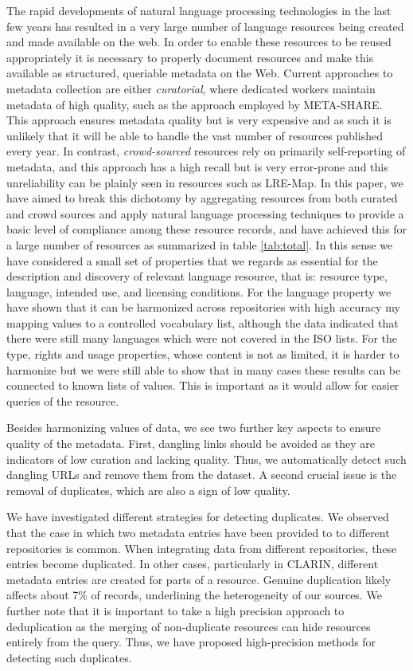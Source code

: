 \documentclass[11pt]{article}
\begin{document}
The rapid developments of natural language processing technologies in the last
few years has resulted in a very large number of language resources being
created and made available on the web. In order to enable these resources to be
reused appropriately it is necessary to properly document resources and make
this available as structured, queriable metadata on the Web. Current approaches
to metadata collection are either \emph{curatorial}, where dedicated workers
maintain metadata of high quality, such as the approach employed by META-SHARE.
This approach ensures metadata quality but is very expensive and as such it is
unlikely that it will be able to handle the vast number of resources published
every year. In contrast, \emph{crowd-sourced} resources rely on primarily
self-reporting of metadata, and this approach has a high recall but is very
error-prone and this unreliability can be plainly seen in resources such as
LRE-Map. In this paper, we have aimed to break this dichotomy by aggregating
resources from both curated and crowd sources and apply natural language
processing techniques to provide a basic level of compliance among these
resource records, and have achieved this for a large number of resources as
summarized in table \ref{tab:total}. In this sense we have considered a small set of properties that we regards as essential for the description and discovery of relevant language resource, that is: resource type, language, intended use, and licensing conditions.
For the
language property we have shown that it can be harmonized across repositories with high accuracy my mapping values to a 
controlled vocabulary list, although the data indicated that there were still
many languages which were not covered in the ISO lists. For the type, rights and usage
properties, whose content is not as limited, it is harder to harmonize but we
were still able to show that in many cases these results can be connected to
known lists of values. This is important as it would allow for easier queries of
the resource. 

Besides harmonizing values of data, we see two further key aspects to ensure quality of the metadata.
First, dangling links should be avoided as they are indicators of low curation and lacking quality. Thus, we automatically detect such dangling URLs and remove them from the dataset. A second crucial issue is the removal of duplicates, which are also a sign of low quality.

We have investigated different strategies for detecting duplicates. We observed
that the case in which two metadata entries have been provided to to different
repositories is common. When integrating data from different repositories, these
entries become duplicated. In other cases, particularly in CLARIN, different
metadata entries are created for parts of a resource. Genuine duplication likely
affects about 7\% of records, underlining the heterogeneity of our sources. We further note that it is important to take
a high precision approach to deduplication as the merging of non-duplicate
resources can hide resources entirely from the query. Thus, we have proposed 
high-precision methods for detecting such duplicates. 
\end{document}
